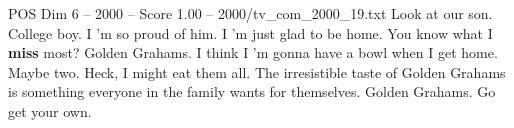 \begin{textsample}{POS Dim 6 – 2000 – Score 1.00 – 2000/tv\_com\_2000\_19.txt}  \label{ex:f6_pos_086}
Look at our son.
College boy.
I 'm so proud of him.
I 'm just glad to be home.
You know what I \textbf{miss} most?
Golden Grahams.
I think I 'm gonna have a bowl when I get home.
Maybe two.
Heck, I might eat them all.
The irresistible taste of Golden Grahams is something everyone in the family wants for themselves.
Golden Grahams.
Go get your own.

\end{textsample}
